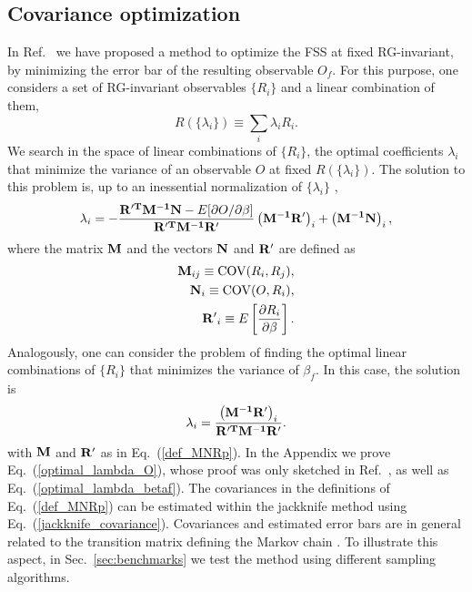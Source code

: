 \documentclass[pre,twocolumn]{revtex4-2}
\begin{document}
\subsection{Covariance optimization}
\label{sec:fss:covariance}
In Ref.~\cite{PT-11} we have proposed a method to optimize the FSS at fixed RG-invariant, by minimizing the error bar of the resulting observable $O_f$.
For this purpose, one considers a set of RG-invariant observables $\{R_i\}$ and a linear combination of them,
\begin{equation}
  R(\{\lambda_i\}) \equiv \sum_i \lambda_i R_i.
  \label{R_lambda}
\end{equation}
We search in the space of linear combinations of $\{R_i\}$, the optimal coefficients $\lambda_i$ that minimize the variance of an observable $O$ at fixed $R(\{\lambda_i\})$.
The solution to this problem is, up to an inessential normalization of $\{\lambda_i\}$ \cite{PT-11},
\begin{equation}
\lambda_i = -\frac{{\bf R'^T M^{-1}N}-E[\partial O/\partial\beta]}{\bf R'^TM^{-1}R'}\left({\bf M^{-1}R'}\right)_i+\left({\bf M^{-1}N}\right)_i,
\label{optimal_lambda_O}
\end{equation}
where the matrix ${\bf M}$ and the vectors ${\bf N}$ and ${\bf R'}$ are defined as
\begin{equation}
  \begin{split}
    {\bf M}_{ij} \equiv {\rm COV}(R_i, R_j),\\
    {\bf N}_i \equiv {\rm COV}(O, R_i),\\
    {\bf R'}_i \equiv E\left[\frac{\partial R_i}{\partial\beta}\right].
  \end{split}
  \label{def_MNRp}
\end{equation}
Analogously, one can consider the problem of finding the optimal linear combinations of $\{R_i\}$ that minimizes the variance of $\beta_f$.
In this case, the solution is
\begin{equation}
  \lambda_i = \frac{\left({\bf M^{-1}R'}\right)_i}{\bf R'^TM^{-1}R'}.
  \label{optimal_lambda_betaf}
\end{equation}
with ${\bf M}$ and ${\bf R'}$ as in Eq.~(\ref{def_MNRp}).
In the Appendix we prove Eq.~(\ref{optimal_lambda_O}), whose proof was only sketched in Ref.~\cite{PT-11}, as well as Eq.~(\ref{optimal_lambda_betaf}).
The covariances in the definitions of Eq.~(\ref{def_MNRp}) can be estimated within the jackknife method using Eq.~(\ref{jackknife_covariance}).
Covariances and estimated error bars are in general related to the transition matrix defining the Markov chain \cite{Sokal_lecture}.
To illustrate this aspect, in Sec.~\ref{sec:benchmarks} we test the method using different sampling algorithms.
\end{document}
